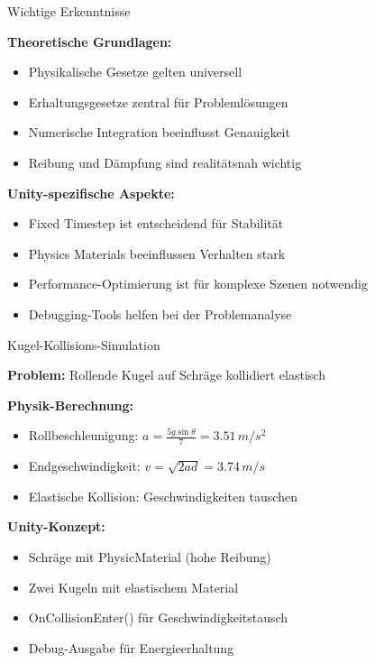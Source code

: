 \begin{theorem}{Wichtige Erkenntnisse}

    \textbf{Theoretische Grundlagen:}
    \begin{itemize}
        \item Physikalische Gesetze gelten universell
        \item Erhaltungsgesetze zentral für Problemlösungen
        \item Numerische Integration beeinflusst Genauigkeit
        \item Reibung und Dämpfung sind realitätsnah wichtig
    \end{itemize}
    
    \textbf{Unity-spezifische Aspekte:}
    \begin{itemize}
        \item Fixed Timestep ist entscheidend für Stabilität
        \item Physics Materials beeinflussen Verhalten stark
        \item Performance-Optimierung ist für komplexe Szenen notwendig
        \item Debugging-Tools helfen bei der Problemanalyse
    \end{itemize}
\end{theorem}

\begin{example2}{Kugel-Kollisions-Simulation}

    \textbf{Problem:} Rollende Kugel auf Schräge kollidiert elastisch
    
    \textbf{Physik-Berechnung:}
    \begin{itemize}
        \item Rollbeschleunigung: $a = \frac{5g\sin\theta}{7} = 3.51 \, m/s^2$
        \item Endgeschwindigkeit: $v = \sqrt{2ad} = 3.74 \, m/s$
        \item Elastische Kollision: Geschwindigkeiten tauschen
    \end{itemize}
    
    \textbf{Unity-Konzept:}
    \begin{itemize}
        \item Schräge mit PhysicMaterial (hohe Reibung)
        \item Zwei Kugeln mit elastischem Material
        \item OnCollisionEnter() für Geschwindigkeitstausch
        \item Debug-Ausgabe für Energieerhaltung
    \end{itemize}
\end{example2}

